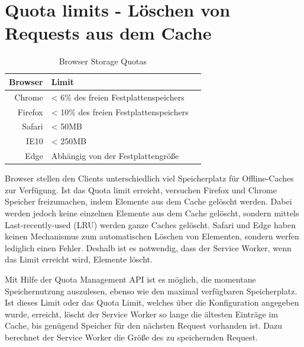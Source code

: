 \section{Quota limits - Löschen von Requests aus dem Cache}\label{i:quotas}
\begin{table}[!htb]
	\begin{center}


	\begin{tabular}{|r|l|l|}
		\hline
		Browser	& Limit \\ \hline
		Chrome & < 6\% des freien Festplattenspeichers \\ \hline
		Firefox & < 10\% des freien Festplattenspeichers \\ \hline
		Safari & < 50MB \\ \hline
		IE10 & < 250MB \\ \hline
		Edge & Abhängig von der Festplattengröße \\ 
		\hline
	\end{tabular}
	\caption{Browser Storage Quotas\cite{offline-pwa}}

\end{center}
\end{table}

Browser stellen den Clients unterschiedlich viel Speicherplatz für Offline-Caches zur Verfügung. Ist das Quota limit erreicht, versuchen Firefox und Chrome Speicher freizumachen, indem Elemente aus dem Cache gelöscht werden. Dabei werden jedoch keine einzelnen Elemente aus dem Cache gelöscht, sondern mittels Last-recently-used (LRU) werden ganze Caches gelöscht. Safari und Edge haben keinen Mechanismus zum automatischen Löschen von Elementen, sondern werfen lediglich einen Fehler.\cite{offline-pwa} Deshalb ist es notwendig, dass der Service Worker, wenn das Limit erreicht wird, Elemente löscht.

Mit Hilfe der Quota Management API\cite{quota-api-ff} ist es möglich, die momentane Speichernutzung auszulesen, ebenso wie den maximal verfügbaren Speicherplatz. Ist dieses Limit oder das Quota Limit, welches über die Konfiguration angegeben wurde, erreicht, löscht der Service Worker so lange die ältesten Einträge im Cache, bis genügend Speicher für den nächsten Request vorhanden ist. Dazu berechnet der Service Worker die Größe des zu speichernden Request. 


